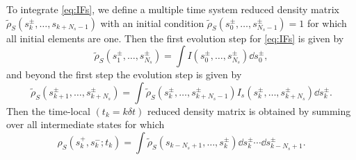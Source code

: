 \documentclass[11pt]{book}
\begin{document}
To integrate \eqref{eq:IFs}, we define a multiple time system reduced
density matrix \(\tilde{\rho}_S(s_k^{\pm},\ldots,s_{k+N_s-1})\) with an
initial condition \(\tilde{\rho}_S(s_0^{\pm},\ldots,s_{N_s-1}^{\pm})=1\)
for which all initial elements are one. Then the first evolution step
for \eqref{eq:IFs} is given by
\begin{equation}
\tilde{\rho}_S(s_1^{\pm},\ldots,s_{N_s}^{\pm})=
\int I(s_0^{\pm},\ldots,s_{N_s}^{\pm})\dd{s_0^{\pm}},
\end{equation}
and beyond the first step the evolution step is given by 
\begin{equation}
\tilde{\rho}_S(s_{k+1}^{\pm},\ldots,s_{k+N_s}^{\pm})=
\int\tilde{\rho}_S(s_k^{\pm},\ldots,s_{k+N_s-1}^{\pm})
I_s(s_k^{\pm},\ldots,s_{k+N_s}^{\pm})\dd{s_k^{\pm}}.
\end{equation}
Then the time-local \((t_k=k\delta t)\) reduced density matrix is
obtained by summing over all intermediate states for which
\begin{equation}
\rho_S(s_k^+,s_k^-;t_k)=\int\tilde{\rho}_S(s_{k-N_s+1},\ldots,s_k^{\pm})
\dd{s_{k}^{\pm}}\cdots\dd{s_{k-N_s+1}^{\pm}}.
\end{equation}
\end{document}
